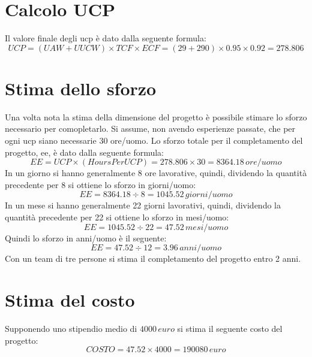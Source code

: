 \section{Calcolo UCP}
Il valore finale degli \acrfull{ucp} è dato dalla seguente formula:
\begin{displaymath}
	UCP = (UAW + UUCW) \times TCF \times ECF = (29 + 290) \times 0.95 \times 0.92 = 278.806 
\end{displaymath}

\section{Stima dello sforzo}
Una volta nota la stima della dimensione del progetto è possibile stimare lo sforzo necessario per comopletarlo.
Si assume, non avendo esperienze passate, che per ogni \gls{ucp} siano necessarie 30 ore/uomo.
Lo sforzo totale per il completamento del progetto, \gls{ee}, è dato dalla seguente formula:
\begin{displaymath}
	EE = UCP \times (Hours Per UCP) = 278.806 \times 30 = 8364.18\, ore/uomo
\end{displaymath}
In un giorno si hanno generalmente 8 ore lavorative, quindi, dividendo la quantità precedente per 8 si ottiene lo sforzo in giorni/uomo:
\begin{displaymath}
	EE = 8364.18 \div 8 = 1045.52\, giorni/uomo
\end{displaymath}
In un mese si hanno generalmente 22 giorni lavorativi, quindi, dividendo la quantità precedente per 22 si ottiene lo sforzo in mesi/uomo:
\begin{displaymath}
	EE = 1045.52 \div 22 = 47.52\, mesi/uomo
\end{displaymath}
Quindi lo sforzo in anni/uomo è il seguente:
\begin{displaymath}
	EE = 47.52 \div 12 = 3.96\, anni/uomo
\end{displaymath}
Con un team di tre persone si stima il completamento del progetto entro 2 anni.

\section{Stima del costo}
Supponendo uno stipendio medio di \(4000\, euro\) si stima il seguente costo del progetto:
\begin{displaymath}
	COSTO = 47.52 \times 4000 = 190080\, euro
\end{displaymath}


